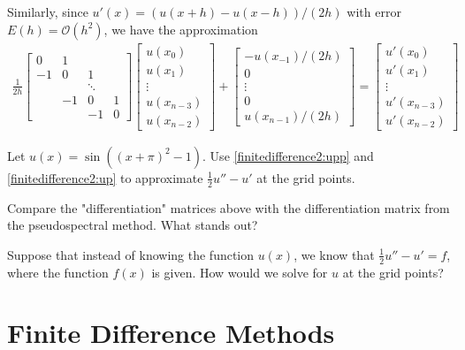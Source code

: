 Similarly, since  $u'(x) = (u(x+h) - u(x-h))/(2h)$ with error $E(h) = \mathcal{O}(h^2)$, we have the approximation 
\begin{align}
\frac{1}{2h}
\begin{bmatrix}
0 & 1 & \\
-1 & 0 & 1  \\
& &\ddots & \\
 & -1 & 0 & 1 \\
 & & -1 & 0
\end{bmatrix}
\begin{bmatrix}
u(x_0) \\ u(x_1)\\ \vdots  \\ u(x_{n-3}) \\ u(x_{n-2})
\end{bmatrix} + 
\begin{bmatrix}
-u(x_{-1})/(2h) \\ 0 \\ \vdots  \\ 0 \\ u(x_{n-1})/(2h)
\end{bmatrix} = 
\begin{bmatrix}
u'(x_0) \\ u'(x_1)\\ \vdots  \\ u'(x_{n-3}) \\ u'(x_{n-2})
\end{bmatrix}\label{finitedifference2:up}
\end{align}

\begin{problem}
	Let $u(x) = \sin((x+\pi)^2-1)$. Use \eqref{finitedifference2:upp} and \eqref{finitedifference2:up} to approximate $\frac{1}{2}u'' - u'$ at the grid points.
	
	Compare the "differentiation" matrices above with the differentiation matrix from the pseudospectral method. What stands out? 
\label{prob:finitedifference2:prob1}
\end{problem}

Suppose that instead of knowing the function $u(x)$, we know that $\frac{1}{2}u'' - u' = f$, where the function $f(x)$ is given. 
How would we solve for $u$ at the grid points?

\section{Finite Difference Methods}

